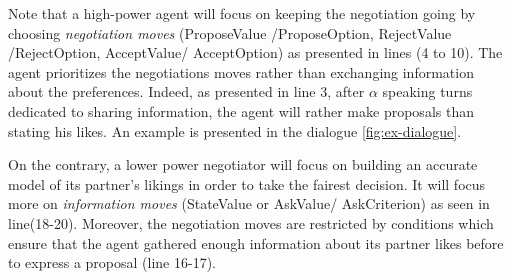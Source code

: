 \documentclass{llncs}
\begin{document}
		Note that a high-power agent will focus on keeping the negotiation going by choosing \emph{negotiation moves} (ProposeValue /ProposeOption, RejectValue /RejectOption, AcceptValue/ AcceptOption) as presented in lines (4 to 10). The agent prioritizes the negotiations moves rather than exchanging information about the preferences. Indeed, as presented in line 3, after $\alpha$  speaking turns dedicated to sharing information, the agent will rather make proposals than stating his likes. An example is presented in the dialogue \ref{fig:ex-dialogue}. 
		
		On the contrary, a lower power negotiator will focus on building an accurate model of its partner's likings in order to take the fairest decision. It will focus more on \emph{information moves} (StateValue or AskValue/ AskCriterion) as seen in line(18-20). Moreover, the negotiation moves are restricted by conditions which ensure that the agent gathered enough information about its partner likes before to express a proposal (line 16-17).
\end{document}
